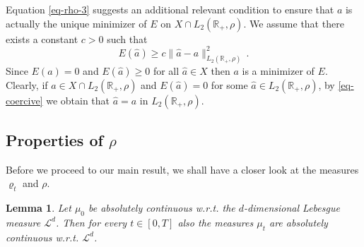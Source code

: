 \documentclass[A4paper,11pt]{article}
\newtheorem{lemma}[theorem]{Lemma}
\theoremstyle{definition}
\newcommand{\R}{\mathbb{R}}
\newcommand{\cl}{\mathcal{L}}
\begin{document}
Equation \eqref{eq-rho-3} suggests an additional relevant condition to ensure that $a$ is actually the unique minimizer of $E$ on $X\cap L_2(\R_+,\rho)$. We assume that there exists a constant $c>0$ such that
\begin{equation}\label{eq-coercive}
	E(\widehat a)\geq c\|\widehat a-a\|^2_{L_2(\R_+,\rho)}\,.
\end{equation}
Since $E(a)=0$ and $E(\widehat a)\geq 0$ for all $\widehat a\in X$ then $a$ is a minimizer of $E$. Clearly, if $a\in X\cap L_2(\R_+,\rho)$ and $E(\widehat a)=0$ for some $\widehat a\in L_2(\R_+,\rho)$, by \eqref{eq-coercive} we obtain that $\widehat a=a$ in $L_2(\R_+,\rho)$.

\subsection{Properties of $\rho$}

Before we proceed to our main result, we shall have a closer look at the measures $\varrho_t$ and $\rho$.

\begin{lemma}\label{lemma-AC-1}
	Let $\mu_0$ be absolutely continuous w.r.t. the $d$-dimensional Lebesgue measure $\cl^d$. Then for every
	$t\in [0,T]$ also the measures $\mu_t$ are absolutely continuous w.r.t. $\cl^d$.
\end{lemma}
\end{document}
